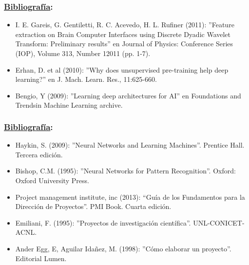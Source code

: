 \begin{frame}
	\frametitle{\underline{Bibliograf\'ia}:}
	\begin{itemize}
		\item I. E. Gareis, G. Gentiletti, R. C. Acevedo, H. L. Rufiner (2011): ''Feature extraction on Brain Computer Interfaces using Discrete Dyadic Wavelet Transform: Preliminary results'' en Journal of Physics: Conference Series (IOP), Volume 313, Number 12011 (pp. 1-7). \\
		\item Erhan, D. et al (2010): ''Why does unsupervised pre-training help deep learning?'' en J. Mach. Learn. Res., 11:625-660. 
		\item Bengio, Y (2009): ''Learning deep architectures for AI'' en Foundations and Trends\textregistered in Machine Learning archive.\\
		
	\end{itemize}	
\end{frame}

\begin{frame}
	\frametitle{\underline{Bibliograf\'ia}:}
	\begin{itemize}
		\item Haykin, S. (2009): ''Neural Networks and Learning Machines''. Prentice Hall. Tercera edici\'on.
		\item Bishop, C.M. (1995): ''Neural Networks for Pattern Recognition''. Oxford: Oxford University Press.
		\item Project management institute, inc (2013): “Gu\'ia de los Fundamentos para la Direcci\'on de Proyectos''. PMI Book. Cuarta edici\'on.
		\item Emiliani, F. (1995): ''Proyectos de investigaci\'on cient\'ifica''. UNL-CONICET-ACNL.
		\item Ander Egg, E, Aguilar Ida\~nez, M. (1998): ''C\'omo elaborar un proyecto''. Editorial Lumen.
		
	\end{itemize}	
\end{frame}


	

